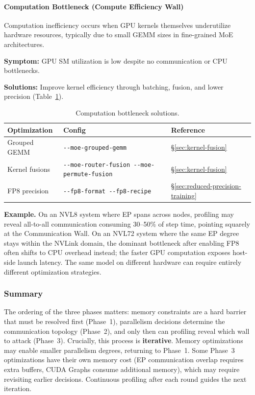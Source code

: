\paragraph*{Computation Bottleneck (Compute Efficiency Wall)}
Computation inefficiency occurs when GPU kernels themselves underutilize hardware resources, typically due to small GEMM sizes in fine-grained MoE architectures.

\noindent\textbf{Symptom:} GPU SM utilization is low despite no communication or CPU bottlenecks.

\noindent\textbf{Solutions:} Improve kernel efficiency through batching, fusion, and lower precision (Table~\ref{tab:compute-bottleneck}).

\begin{table}[ht]
\centering
\caption{Computation bottleneck solutions.}
\label{tab:compute-bottleneck}
\begin{tabular}{llp{4cm}}
\toprule
\textbf{Optimization} & \textbf{Config} & \textbf{Reference} \\
\midrule
Grouped GEMM & \texttt{-{}-moe-grouped-gemm} & \S\ref{sec:kernel-fusion} \\
Kernel fusions & \texttt{-{}-moe-router-fusion -{}-moe-permute-fusion} & \S\ref{sec:kernel-fusion} \\
FP8 precision & \texttt{-{}-fp8-format -{}-fp8-recipe} & \S\ref{sec:reduced-precision-training} \\
\bottomrule
\end{tabular}
\end{table}

\noindent\textbf{Example.} On an NVL8 system where EP spans across nodes, profiling may reveal all-to-all communication consuming 30--50\% of step time, pointing squarely at the Communication Wall. On an NVL72 system where the same EP degree stays within the NVLink domain, the dominant bottleneck after enabling FP8 often shifts to CPU overhead instead; the faster GPU computation exposes host-side launch latency. The same model on different hardware can require entirely different optimization strategies.

\subsubsection{Summary}

The ordering of the three phases matters: memory constraints are a hard barrier that must be resolved first (Phase~1), parallelism decisions determine the communication topology (Phase~2), and only then can profiling reveal which wall to attack (Phase~3). Crucially, this process is \textbf{iterative}. Memory optimizations may enable smaller parallelism degrees, returning to Phase~1. Some Phase~3 optimizations have their own memory cost (EP communication overlap requires extra buffers, CUDA Graphs consume additional memory), which may require revisiting earlier decisions. Continuous profiling after each round guides the next iteration.

